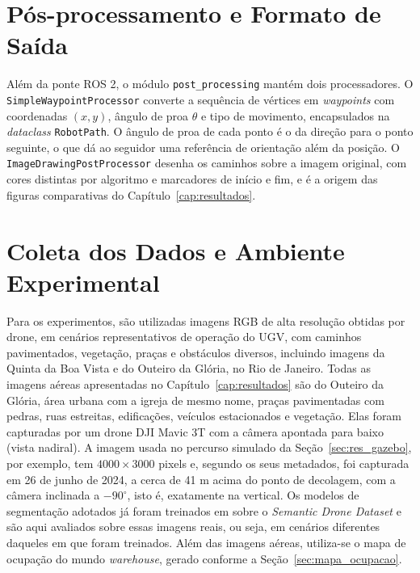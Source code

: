 \documentclass[
    12pt,
    openright,
    oneside,
    a4paper,
    english,
    brazil
]{abntex2}
\begin{document}
\section{Pós-processamento e Formato de Saída}

Além da ponte ROS 2, o módulo \texttt{post\_\allowbreak{}processing} mantém dois processadores. O \texttt{SimpleWaypointProcessor} converte a sequência de vértices em \textit{waypoints} com coordenadas $(x, y)$, ângulo de proa $\theta$ e tipo de movimento, encapsulados na \textit{dataclass} \texttt{RobotPath}. O ângulo de proa de cada ponto é o da direção para o ponto seguinte, o que dá ao seguidor uma referência de orientação além da posição. O \texttt{ImageDrawingPostProcessor} desenha os caminhos sobre a imagem original, com cores distintas por algoritmo e marcadores de início e fim, e é a origem das figuras comparativas do Capítulo~\ref{cap:resultados}.

\section{Coleta dos Dados e Ambiente Experimental}
\label{sec:ambiente}

Para os experimentos, são utilizadas imagens RGB de alta resolução obtidas por drone, em cenários representativos de operação do UGV, com caminhos pavimentados, vegetação, praças e obstáculos diversos, incluindo imagens da Quinta da Boa Vista e do Outeiro da Glória, no Rio de Janeiro. Todas as imagens aéreas apresentadas no Capítulo~\ref{cap:resultados} são do Outeiro da Glória, área urbana com a igreja de mesmo nome, praças pavimentadas com pedras, ruas estreitas, edificações, veículos estacionados e vegetação. Elas foram capturadas por um drone DJI Mavic 3T com a câmera apontada para baixo (vista nadiral). A imagem usada no percurso simulado da Seção~\ref{sec:res_gazebo}, por exemplo, tem $4000 \times 3000$ pixels e, segundo os seus metadados, foi capturada em 26 de junho de 2024, a cerca de 41 m acima do ponto de decolagem, com a câmera inclinada a $-90^\circ$, isto é, exatamente na vertical. Os modelos de segmentação adotados já foram treinados em \cite{junior2024_models} sobre o \emph{Semantic Drone Dataset} \cite{drone_dataset} e são aqui avaliados sobre essas imagens reais, ou seja, em cenários diferentes daqueles em que foram treinados. Além das imagens aéreas, utiliza-se o mapa de ocupação do mundo \textit{warehouse}, gerado conforme a Seção~\ref{sec:mapa_ocupacao}.
\end{document}
